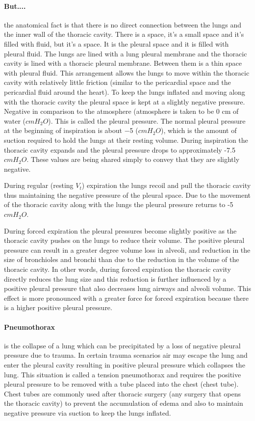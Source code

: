 \paragraph{But....} the anatomical fact is that there is no direct connection between the lungs and the inner wall of the thoracic cavity. There is a space, it's a small space and it's filled with fluid, but it's a space. It is the pleural space and it is filled with pleural fluid. The lungs are lined with a lung pleural membrane and the thoracic cavity is lined with a thoracic pleural membrane. Between them is a thin space with pleural fluid. This arrangement allows the lungs to move within the thoracic cavity with relatively little friction (similar to the pericardial space and the pericardial fluid around the heart). 
To keep the lungs inflated and moving along with the thoracic cavity the pleural space is kept at a slightly negative pressure. Negative in comparison to the atmosphere (atmosphere is taken to be 0 cm of water ($cm H_2O$). This is called the pleural pressure. The normal pleural pressure at the beginning of inspiration is about −5 ($cm H_2O$), which is the amount of suction required to hold the lungs at their resting volume. During inspiration the thoracic cavity expands and the pleural pressure drops to approximately -7.5 $cm H_2O$. These values are being shared simply to convey that they are slightly negative. 

During regular (resting $V_t$) expiration the lungs recoil and pull the thoracic cavity thus maintaining the negative pressure of the pleural space. Due to the movement of the thoracic cavity along with the lungs the pleural pressure returns to -5 $cm H_2O$.

During forced expiration the pleural pressures become slightly positive as the thoracic cavity pushes on the lungs to reduce their volume. The positive pleural pressure can result in a greater degree volume loss in alveoli, and reduction in the size of bronchioles and bronchi than due to the reduction in the volume of the thoracic cavity. In other words, during forced expiration the thoracic cavity directly reduces the lung size and this reduction is further influenced by a positive pleural pressure that also decreases lung airways and alveoli volume. This effect is more pronounced with a greater force for forced expiration because there is a higher positive pleural pressure.

\paragraph{Pneumothorax} is the collapse of a lung which can be precipitated by a loss of negative pleural pressure due to trauma. In certain trauma scenarios air may escape the lung and enter the pleural cavity resulting in positive pleural pressure which collapses the lung. This situation is called a tension pneumothorax and requires the positive pleural pressure to be removed with a tube placed into the chest (chest tube). Chest tubes are commonly used after thoracic surgery (any surgery that opens the thoracic cavity) to prevent the accumulation of edema and also to maintain negative pressure via suction to keep the lungs inflated.

